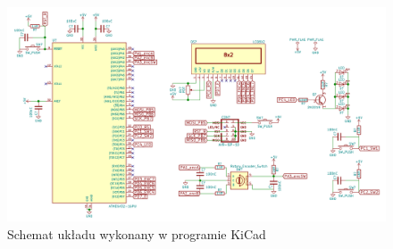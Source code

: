 \documentclass{article}
\begin{document}
\begin{figure}
	\centering
	\includegraphics[width=\textwidth]{img/scheme.png}
	\caption{Schemat układu wykonany w programie KiCad}
	\label{fig:schemat1}
\end{figure}
\end{document}
